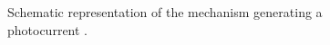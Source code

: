 \begin{figure}[h]
    \centering
    
    \caption{Schematic representation of the mechanism generating 
    a photocurrent \citep{memming2008,bard2002}.}
    \label{fig_photocurrent_generation}
\end{figure}
